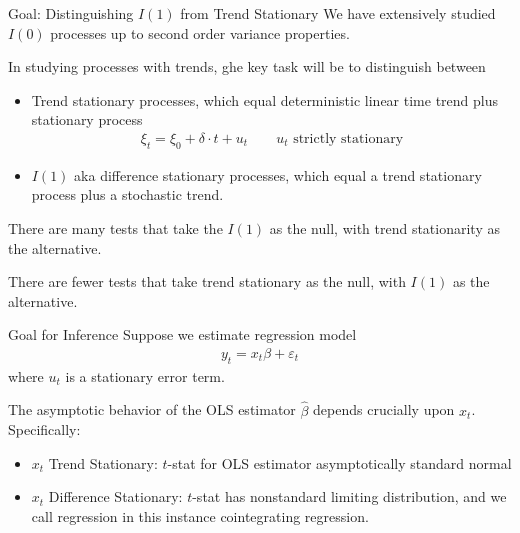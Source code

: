 \documentclass[aspectratio=169, handout]{beamer}
\begin{document}
{\footnotesize
\begin{frame}{Goal: Distinguishing $I(1)$ from Trend Stationary}
We have extensively studied $I(0)$ processes up to second order variance
properties.

In studying processes with trends, ghe key task will be to distinguish
between
\begin{itemize}
  \item Trend stationary processes, which equal deterministic linear
    time trend plus stationary process
    \begin{align*}
      \xi_t = \xi_0 + \delta\cdot t + u_t
      \qquad
      \text{$u_t$ strictly stationary}
    \end{align*}

  \item $I(1)$ aka difference stationary processes, which equal a trend
    stationary process plus a stochastic trend.
\end{itemize}
There are many tests that take the $I(1)$ as the null, with trend
stationarity as the alternative.

There are fewer tests that take trend stationary as the null, with
$I(1)$ as the alternative.
\end{frame}
}


{\footnotesize
\begin{frame}{Goal for Inference}
Suppose we estimate regression model
\begin{align*}
  y_t = x_t\beta + \varepsilon_t
\end{align*}
where $u_t$ is a stationary error term.

The asymptotic behavior of the OLS estimator $\hat{\beta}$ depends
crucially upon $x_t$. Specifically:
\begin{itemize}
  \item $x_t$ Trend Stationary: $t$-stat for OLS estimator
    asymptotically standard normal
  \item $x_t$ Difference Stationary:
    $t$-stat has nonstandard limiting distribution, and we call
    regression in this instance \alert{cointegrating regression}.
\end{itemize}
\end{frame}
}
\end{document}
